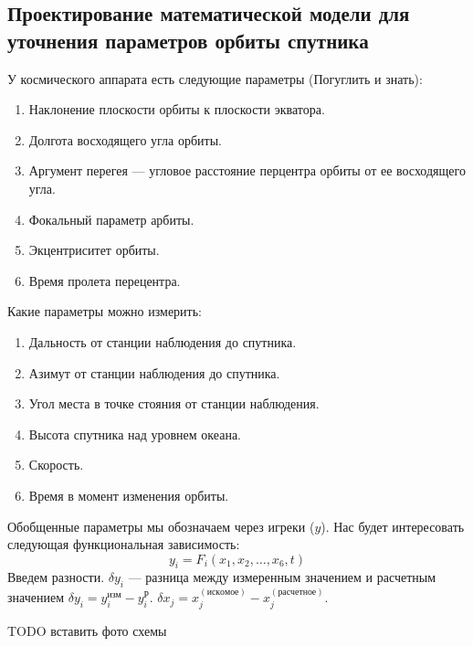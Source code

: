 \subsection{Проектирование математической модели для уточнения параметров орбиты
спутника}
У космического аппарата есть следующие параметры ({\ttfamily Погуглить и знать}):
\begin{enumerate}
	\item Наклонение плоскости орбиты к плоскости экватора.
	\item Долгота восходящего угла орбиты.
	\item Аргумент перегея --- угловое расстояние перцентра орбиты от ее восходящего
		угла.
	\item Фокальный параметр арбиты.
	\item Экцентриситет орбиты.
	\item Время пролета перецентра.
\end{enumerate}\par
Какие параметры можно измерить:
\begin{enumerate}
	\item Дальность от станции наблюдения до спутника.
	\item Азимут от станции наблюдения до спутника.
	\item Угол места в точке стояния от станции наблюдения.
	\item Высота спутника над уровнем океана.
	\item Скорость.
	\item Время в момент изменения орбиты.
\end{enumerate}
Обобщенные параметры мы обозначаем через игреки ($y$). Нас будет интересовать
следующая функциональная зависимость:
\[y_i = F_i(x_1, x_2, \dots, x_6, t)\]
Введем разности. $\delta y_i$ --- разница между измеренным значением и
расчетным значением $\delta y_i = y_i^{изм} - y_i^{Р}$. $\delta x_j =
x_j^{(искомое)} - x_j^{(расчетное)}$.

{\Large \ttfamily TODO вставить фото схемы}\par

